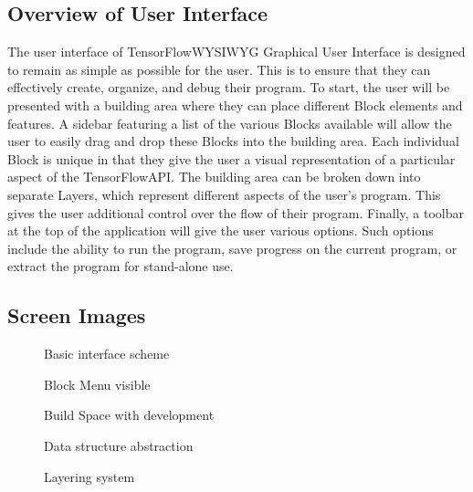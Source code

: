 \documentclass[journal,10pt,onecolumn,compsoc]{IEEEtran} \usepackage[margin=1.0in]{geometry} \usepackage{pdfpages}
\begin{document}
\subsection{Overview of User Interface}
\noindent The user interface of TensorFlow\texttrademark WYSIWYG Graphical User Interface is designed to remain as simple as possible for the user. 
This is to ensure that they can effectively create, organize, and debug their program. 
To start, the user will be presented with a building area where they can place different Block elements and features. 
A sidebar featuring a list of the various Blocks available will allow the user to easily drag and drop these Blocks into the building area. 
Each individual Block is unique in that they give the user a visual representation of a particular aspect of the TensorFlow\texttrademark API. 
The building area can be broken down into separate Layers, which represent different aspects of the user's program. 
This gives the user additional control over the flow of their program. 
Finally, a toolbar at the top of the application will give the user various options. 
Such options include the ability to run the program, save progress on the current program, or extract the program for stand-alone use.
\subsection{Screen Images}
\begin{figure}[H]
\caption{Basic interface scheme}
\label{fig:Basic}
\end{figure}

\begin{figure}[H]
\caption{Block Menu visible}
\label{fig:Data}
\end{figure}

\begin{figure}[H]
\caption{Build Space with development}
\end{figure}

\begin{figure}[H]
\caption{Data structure abstraction}
\label{fig:Abstract}
\end{figure}

\begin{figure}[H]
\caption{Layering system}
\label{fig:outLayer}
\end{figure}
\end{document}
